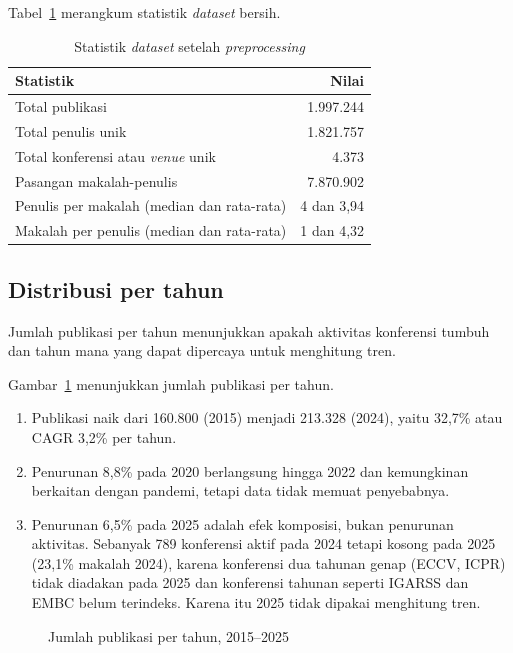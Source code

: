 Tabel~\ref{tab:statistik} merangkum statistik \textit{dataset} bersih.

\begin{table}[!htb]
\caption{Statistik \textit{dataset} setelah \textit{preprocessing}}
\label{tab:statistik}
\small
\begin{tabular*}{\textwidth}{@{\extracolsep{\fill}}@{}lr@{}}
\toprule
\textbf{Statistik} & \textbf{Nilai} \\
\midrule
Total publikasi & 1.997.244 \\
Total penulis unik & 1.821.757 \\
Total konferensi atau \textit{venue} unik & 4.373 \\
Pasangan makalah-penulis & 7.870.902 \\
Penulis per makalah (median dan rata-rata) & 4 dan 3,94 \\
Makalah per penulis (median dan rata-rata) & 1 dan 4,32 \\
\bottomrule
\end{tabular*}
\end{table}

\subsection{Distribusi per tahun}
\label{sec:hasil-tahun}
Jumlah publikasi per tahun menunjukkan apakah aktivitas konferensi tumbuh dan tahun mana yang dapat dipercaya untuk menghitung tren.

Gambar~\ref{fig:per-tahun} menunjukkan jumlah publikasi per tahun.
\begin{enumerate}
\item Publikasi naik dari 160.800 (2015) menjadi 213.328 (2024), yaitu 32,7\% atau CAGR 3,2\% per tahun.
\item Penurunan 8,8\% pada 2020 berlangsung hingga 2022 dan kemungkinan berkaitan dengan pandemi, tetapi data tidak memuat penyebabnya.
\item Penurunan 6,5\% pada 2025 adalah efek komposisi, bukan penurunan aktivitas. Sebanyak 789 konferensi aktif pada 2024 tetapi kosong pada 2025 (23,1\% makalah 2024), karena konferensi dua tahunan genap (ECCV, ICPR) tidak diadakan pada 2025 dan konferensi tahunan seperti IGARSS dan EMBC belum terindeks. Karena itu 2025 tidak dipakai menghitung tren.
\end{enumerate}

\begin{figure}[!htb]
\centering
{}
\caption{Jumlah publikasi per tahun, 2015--2025}
\label{fig:per-tahun}
\end{figure}

